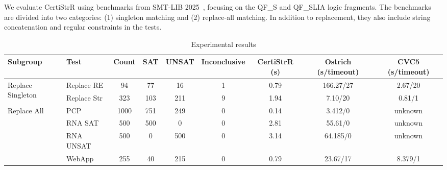We evaluate {CertiStrR} using benchmarks from SMT-LIB 2025~\cite{smtlib_benchmarks}, focusing on the \textsf{QF\_S} and \textsf{QF\_SLIA} logic fragments. The benchmarks are divided into two categories: (1) singleton matching and (2) replace-all matching. In addition to replacement, they also include string concatenation and regular constraints in the tests.






\begin{table}[h]
\centering
\small
\setlength{\tabcolsep}{4pt}
\renewcommand{\arraystretch}{1.1}
\begin{tabular}{llccccccc}
  \toprule
  \textbf{Subgroup} & \textbf{Test} & \textbf{Count} & \textbf{SAT} & \textbf{UNSAT} & \textbf{Inconclusive} & \textbf{CertiStrR (s)} & \textbf{Ostrich (s/timeout)} & \textbf{CVC5 (s/timeout)} \\
  \midrule
  \multirow{2}{*}{Replace Singleton} & Replace RE  & 94  & 77  & 16  & 1 & 0.79 & 166.27/27 & 2.67/20 \\
   & Replace Str & 323 & 103 & 211 & 9 & 1.94 & 7.10/20 & 0.81/1 \\
  \multirow{4}{*}{Replace All} & PCP & 1000 & 751 & 249 & 0 & 0.14 & 3.412/0 & unknown \\
   & RNA SAT   & 500  & 500 & 0   & 0 & 2.81 & 55.61/0 & unknown \\
   & RNA UNSAT & 500  & 0   & 500 & 0 & 3.14 & 64.185/0 & unknown \\
   & WebApp      & 255  & 40  & 215 & 0 & 0.79 & 23.67/17 & 8.379/1 \\
  \bottomrule
\end{tabular}
\caption{Experimental results}
\label{tab:string_operations}
\end{table}


